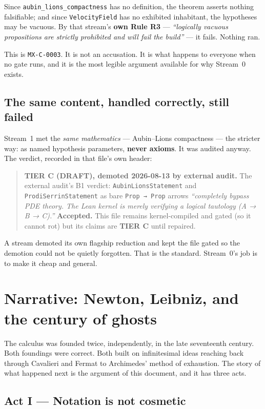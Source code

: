 \documentclass[11pt,a4paper]{article}
\begin{document}
Since \texttt{aubin_lions_compactness} has no definition, the theorem asserts nothing
falsifiable; and since \texttt{VelocityField} has no exhibited inhabitant, the hypotheses may be
vacuous. By that stream's \textbf{own Rule R3} — \emph{``logically vacuous propositions are
strictly prohibited and will fail the build''} — it fails. Nothing ran.

This is \texttt{MX-C-0003}. It is not an accusation. It is what happens to everyone when no gate
runs, and it is the most legible argument available for why Stream~0 exists.

\subsection{The same content, handled correctly, still failed}

Stream~1 met the \emph{same mathematics} — Aubin–Lions compactness — the stricter way: as named
hypothesis parameters, \textbf{never axioms}. It was audited anyway. The verdict, recorded in
that file's own header:

\begin{quote}\small
\textbf{TIER C (DRAFT), demoted 2026-08-13 by external audit.} The external audit's B1 verdict:
\texttt{AubinLionsStatement} and \texttt{ProdiSerrinStatement} as bare \texttt{Prop → Prop}
arrows \emph{``completely bypass PDE theory. The Lean kernel is merely verifying a logical
tautology (A → B → C).''} \textbf{Accepted.} This file remains kernel-compiled and gated (so it
cannot rot) but its claims are \textbf{TIER C} until repaired.
\end{quote}

A stream demoted its own flagship reduction and kept the file gated so the demotion could not be
quietly forgotten. That is the standard. Stream~0's job is to make it cheap and general.

\section{Narrative: Newton, Leibniz, and the century of ghosts}

The calculus was founded twice, independently, in the late seventeenth century. Both foundings
were correct. Both built on infinitesimal ideas reaching back through Cavalieri and Fermat to
Archimedes' method of exhaustion. The story of what happened next is the argument of this
document, and it has three acts.

\subsection*{Act I — Notation is not cosmetic}
\end{document}
